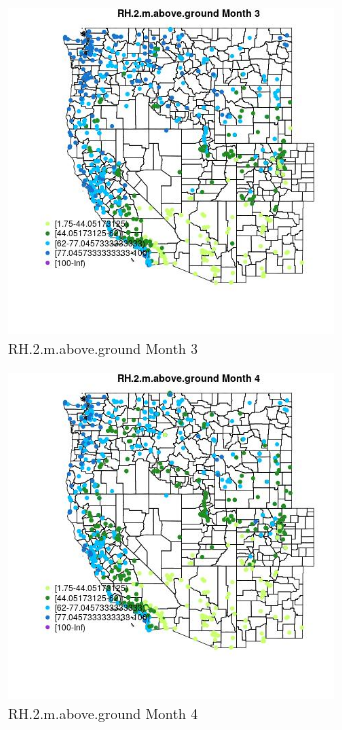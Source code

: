 \begin{figure} 
\centering  
\includegraphics[width=0.77\textwidth]{Code_Outputs/Report_ML_input_PM25_Step4_part_e_de_duplicated_aves_compiled_2019-05-21wNAs_MapObsMo3RH2maboveground.jpg} 
\caption{\label{fig:Report_ML_input_PM25_Step4_part_e_de_duplicated_aves_compiled_2019-05-21wNAsMapObsMo3RH2maboveground}RH.2.m.above.ground Month 3} 
\end{figure} 
 

\begin{figure} 
\centering  
\includegraphics[width=0.77\textwidth]{Code_Outputs/Report_ML_input_PM25_Step4_part_e_de_duplicated_aves_compiled_2019-05-21wNAs_MapObsMo4RH2maboveground.jpg} 
\caption{\label{fig:Report_ML_input_PM25_Step4_part_e_de_duplicated_aves_compiled_2019-05-21wNAsMapObsMo4RH2maboveground}RH.2.m.above.ground Month 4} 
\end{figure} 
 

